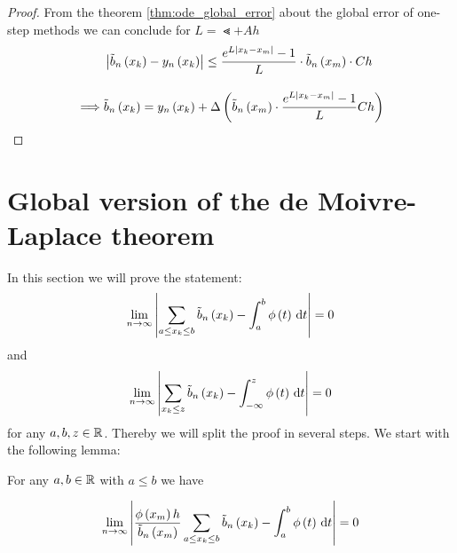 \begin{proof}
  \noindent From the theorem \ref{thm:ode_global_error} about the global error of one-step methods we can conclude for $L=\Lt+Ah$
  \begin{align}
    & \abs{\bb{\x}-\phin{\x}} \le \frac{\fe{L\abs{\x-\xnp}}-1}L \cdot \bnp \cdot Ch \bnl
    \implies & \bb{\x} = \phin{\x} + \bigabs{\bnp \cdot \frac{\fe{L\abs{\x-\xnp}}-1}L Ch}
  \end{align}
\end{proof}

\section{Global version of the de Moivre-Laplace theorem}

In this section we will prove the statement:
\begin{align}
  \lim_{n\to\infty} \abs{\sum_{a \le \x \le b} \bb{\x[k]}- \int_a^b \fphi{t} \d{t}} = 0
\end{align}
and
\begin{align}
  \lim_{n\to\infty} \abs{\sum_{\x \le z} \bb{\x[k]} - \int_{-\infty}^z \fphi{t} \d{t}} = 0
\end{align}
for any $a,b,z\in\R$. Thereby we will split the proof in several steps. We start with the following lemma:

\begin{lemma} \label{alt:lemma1}
  For any $a,b \in \R$ with $a \le b$ we have

  \begin{align}
    \lim_{n\to\infty} \abs{\frac{\fphi{\xnp}h}{\bb{\xnp}} \sum_{a\le\x\le b} \bb{\x} - \int_a^b \fphi{t}\d{t}} = 0
  \end{align}
\end{lemma}

